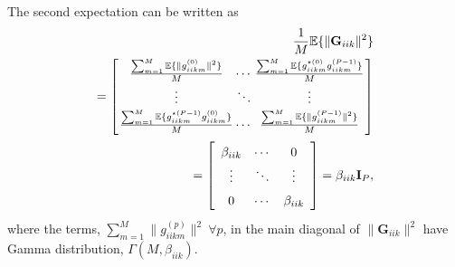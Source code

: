 \documentclass[10pt,journal,comsoc,final]{IEEEtran}
\begin{document}
The second expectation can be written as
\begin{equation}\label{eq:second_term_expectation}
\begin{split}
\frac{1}{M} \mathbb{E}\{ \lVert \textbf{G}_{iik} \rVert^{2} \} \\ = \arraycolsep=1pt\def\arraystretch{1.5} \left[\begin{array}{ccc} \frac{\sum_{m=1}^{M} \mathbb{E} \{ \lVert g_{iikm}^{(0)} \rVert^{2} \}}{M} & \cdots & \frac{\sum_{m=1}^{M} \mathbb{E} \{ g_{iikm}^{\star (0)}g_{iikm}^{(P-1)} \}}{M} \\
\vdots & \ddots & \vdots \\
\frac{\sum_{m=1}^{M} \mathbb{E} \{ g_{iikm}^{\star(P-1)}g_{iikm}^{(0)} \} }{M} & \cdots & \frac{\sum_{m=1}^{M} \mathbb{E} \{ \lVert g_{iikm}^{(P-1)} \rVert^{2} \} }{M}
\end{array} \right] \\ 
= \left[\begin{array}{ccc} \beta_{iik} & \cdots & 0 \\
\vdots & \ddots & \vdots \\
0 & \cdots & \beta_{iik}
\end{array} \right] = \beta_{iik} \textbf{I}_{P},
\end{split}
\end{equation}
where the terms, $\sum_{m=1}^{M} \lVert g_{iikm}^{(p)} \rVert^{2} \ \forall p$, in the main diagonal of $\lVert \textbf{G}_{iik} \rVert^{2}$ have Gamma distribution, $\Gamma(M,\beta_{iik})$.
\end{document}
